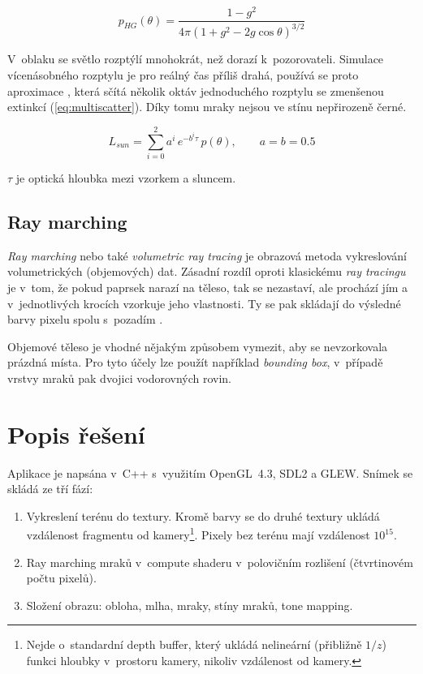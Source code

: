 \documentclass[a4paper, 12pt]{article}
\begin{document}
\begin{equation}
  p_{HG}(\theta) = \frac{1 - g^2}{4 \pi \left(1 + g^2 - 2g\cos\theta\right)^{3/2}}
  \label{eq:hg}
\end{equation}

V~oblaku se světlo rozptýlí mnohokrát, než dorazí k~pozorovateli.
Simulace vícenásobného rozptylu je pro reálný čas příliš drahá, používá se
proto aproximace \cite{wrenninge2013}, která sčítá několik oktáv
jednoduchého rozptylu se zmenšenou extinkcí (\ref{eq:multiscatter}).
Díky tomu mraky nejsou ve stínu nepřirozeně černé.

\begin{equation}
  L_{sun} = \sum_{i=0}^{2} a^i \, e^{-b^i \tau} \, p(\theta), \qquad a = b = 0.5
  \label{eq:multiscatter}
\end{equation}

$\tau$ je optická hloubka mezi vzorkem a sluncem.

\subsection{Ray marching}

\textit{Ray marching} nebo také \textit{volumetric ray tracing} je obrazová
metoda vykreslování volumetrických (objemových) dat.
Zásadní rozdíl oproti klasickému \textit{ray tracingu} je v~tom, že pokud
paprsek narazí na těleso, tak se nezastaví, ale prochází jím a v~jednotlivých
krocích vzorkuje jeho vlastnosti. Ty se pak skládají do výsledné barvy pixelu
spolu s~pozadím \cite{url:wiki-ray-marching}.

Objemové těleso je vhodné nějakým způsobem vymezit, aby se nevzorkovala
prázdná místa. Pro tyto účely lze použít například \textit{bounding box},
v~případě vrstvy mraků pak dvojici vodorovných rovin.


\section{Popis řešení}

Aplikace je napsána v~C++ s~využitím OpenGL~4.3, SDL2 a GLEW.
Snímek se skládá ze tří fází:

\begin{enumerate}
  \item Vykreslení terénu do textury. Kromě barvy se do druhé textury ukládá
    vzdálenost fragmentu od kamery\footnote{Nejde o~standardní depth buffer,
    který ukládá nelineární (přibližně $1/z$) funkci hloubky v~prostoru kamery,
    nikoliv vzdálenost od kamery.}. Pixely bez terénu mají vzdálenost $10^{15}$.
  \item Ray marching mraků v~compute shaderu v~polovičním rozlišení
    (čtvrtinovém počtu pixelů).
  \item Složení obrazu: obloha, mlha, mraky, stíny mraků, tone mapping.
\end{enumerate}
\end{document}
